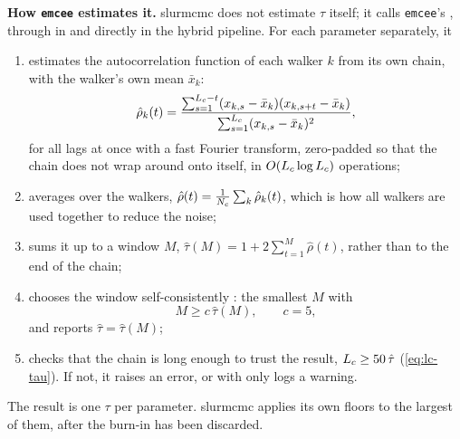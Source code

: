 \textbf{How \texttt{emcee} estimates it.} slurmcmc does not estimate $\tau$ itself; it calls
\texttt{emcee}'s , through  in
 and directly in the hybrid pipeline. For each parameter separately, it
\begin{enumerate}[label=\arabic*.]
  \item estimates the autocorrelation function of each walker $k$ from its own chain, with the
        walker's own mean $\bar x_k$:
        \begin{equation}
          \hat\rho_k(t) = \frac{\sum_{s=1}^{L_c-t} (x_{k,s} - \bar x_k)(x_{k,s+t} - \bar x_k)}
                               {\sum_{s=1}^{L_c} (x_{k,s} - \bar x_k)^2} ,
        \end{equation}
        for all lags at once with a fast Fourier transform, zero-padded so that the chain does not
        wrap around onto itself, in $O(L_c \log L_c)$ operations;
  \item averages over the walkers, $\hat\rho(t) = \frac{1}{N_c}\sum_k \hat\rho_k(t)$, which is how
        all walkers are used together to reduce the noise;
  \item sums it up to a window $M$, $\hat\tau(M) = 1 + 2\sum_{t=1}^{M} \hat\rho(t)$, rather than to
        the end of the chain;
  \item chooses the window self-consistently \citep{sokal1997}: the smallest $M$ with
        \begin{equation}
          M \ge c\,\hat\tau(M), \qquad c = 5,
          \label{eq:window}
        \end{equation}
        and reports $\hat\tau = \hat\tau(M)$;
  \item checks that the chain is long enough to trust the result, $L_c \ge 50\,\hat\tau$
        (\cref{eq:lc-tau}). If not, it raises an error, or with  only logs a
        warning.
\end{enumerate}
The result is one $\tau$ per parameter. slurmcmc applies its own floors to the largest of them,
after the burn-in has been discarded.

